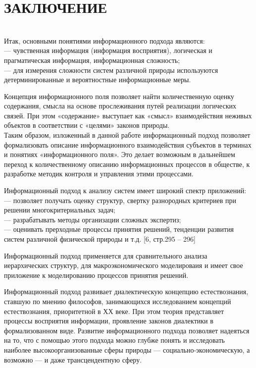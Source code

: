 \documentclass[a4paper,12pt]{report}
\begin{document}
\chapter*{ЗАКЛЮЧЕНИЕ }
 \\
 
Итак, основными понятиями информационного подхода являются:\\
\hspace*{0.7cm} — чувственная информация (информация восприятия), логическая и прагматическая информация, информационная сложность;\\
\hspace*{0.7cm} — для измерения сложности систем различной природы используются детерминированные и вероятностные информационные меры.

Концепция информационного поля позволяет найти количественную оценку содержания, смысла на основе прослеживания путей реализации логических связей. При этом «содержание» выступает как «смысл» взаимодействия неживых объектов в соответствии с «целями» законов природы.\\
Таким образом, изложенный в данной работе информационный подход позволяет формализовать описание информационного взаимодействия субъектов в терминах и понятиях «информационного поля». Это делает возможным в дальнейшем переход к количественному описанию информационных процессов в обществе, к разработке методик контроля и управления этими процессами.

 Информационный подход к анализу систем имеет широкий спектр приложений:\\
\hspace*{0.7cm}—  позволяет получать оценку структур, свертку разнородных критериев при решении многокритериальных задач;\\
\hspace*{0.7cm}—  разрабатывать методы организации сложных экспертиз;\\
\hspace*{0.7cm}—  оценивать прерходные процессы принятия решений, тенденции развития систем различной физической природы и т.д. [6, стр.295 – 296]

 Информационный подход применяется для сравнительного анализа иерархических структур, для макроэкономического моделироваия и  имеет свое приложение к моделированию процессов принятия решений.

Информационный подход развивает диалектическую концепцию естествознания, ставшую по мнению философов, занимающихся исследованием концепций естествознания, приоритетной в ХХ веке. При этом теория представляет процессы восприятия информации, проявление законов диалектики в формализованном виде. Развитие информационного подхода позволяет надеяться на то, что с помощью этого подхода можно глубже понять и исследовать наиболее высокоорганизованные сферы природы — социально-экономическую, а возможно — и даже трансцендентную сферу.
\end{document}
